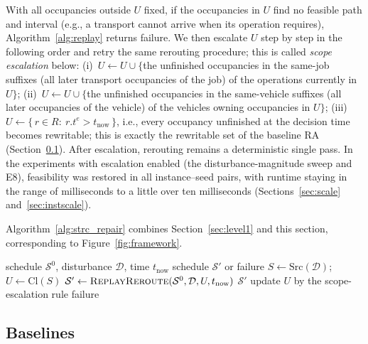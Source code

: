 \documentclass[manuscript,screen,review]{acmart}
\begin{document}
With all occupancies outside \(U\) fixed, if the occupancies in \(U\) find no feasible path and interval (e.g., a transport cannot arrive when its operation requires),
Algorithm~\ref{alg:replay} returns failure. We then escalate \(U\) step by step in the following order and retry the same rerouting procedure; this is called \emph{scope escalation} below:
(i)~\(U\leftarrow U\cup\{\)the unfinished occupancies in the same-job suffixes (all later transport occupancies of the job) of the operations currently in \(U\}\);
(ii)~\(U\leftarrow U\cup\{\)the unfinished occupancies in the same-vehicle suffixes (all later occupancies of the vehicle) of the vehicles owning occupancies in \(U\}\);
(iii)~\(U\leftarrow\{\,r\in R:\ r.t^e>t_{\mathrm{now}}\,\}\), i.e., every occupancy unfinished at the decision time becomes rewritable;
this is exactly the rewritable set of the baseline RA (Section~\ref{sec:vs_r0}).
After escalation, rerouting remains a deterministic single pass. In the experiments with escalation enabled (the disturbance-magnitude sweep and E8), feasibility was restored in all instance--seed pairs,
with runtime staying in the range of milliseconds to a little over ten milliseconds (Sections~\ref{sec:scale} and~\ref{sec:instscale}).

Algorithm~\ref{alg:strc_repair} combines Section~\ref{sec:level1} and this section, corresponding to Figure~\ref{fig:framework}.

\begin{algorithm}[t]
\caption{Bounded repair on the reservation impact set (single-pass rerouting + scope escalation)}
\label{alg:strc_repair}
\begin{algorithmic}[1]
\Require schedule \(\mathcal{S}^0\), disturbance \(\mathcal{D}\), time \(t_{\mathrm{now}}\)
\Ensure schedule \(\mathcal{S}'\) or failure
\State \(S \gets \mathrm{Src}(\mathcal{D})\);
      \(U \gets \mathrm{Cl}(S)\)
  \State \(\mathcal{S}' \gets \textsc{ReplayReroute}(\mathcal{S}^0,\mathcal{D},U,t_{\mathrm{now}})\)
    \State \Return \(\mathcal{S}'\)
  \EndIf
  \State update \(U\) by the scope-escalation rule 
\EndFor
\State \Return failure
\end{algorithmic}
\end{algorithm}

\subsection{Baselines}
\label{sec:vs_r0}
\end{document}
